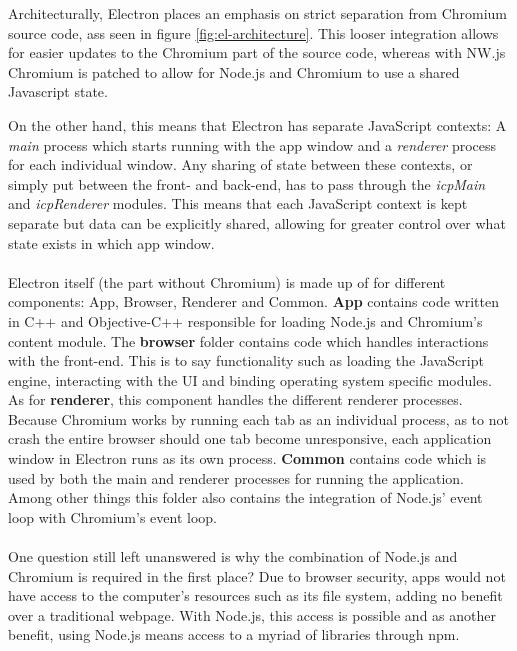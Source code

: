 Architecturally, Electron places an emphasis on strict separation from Chromium source code, ass seen in figure \ref{fig:el-architecture}.
This looser integration allows for easier updates to the Chromium part of the source code, whereas with NW.js Chromium
is patched to allow for Node.js and Chromium to use a shared Javascript state. \parencite{jensen2017}\par
On the other hand, this means that Electron has separate JavaScript contexts: A \emph{main} process which starts running
with the app window and a \emph{renderer} process for each individual window.
Any sharing of state between these contexts, or simply put between the front- and back-end, has to pass through the
\emph{icpMain} and \emph{icpRenderer} modules.
This means that each JavaScript context is kept separate but data can be explicitly shared, allowing for greater control
over what state exists in which app window. \parencite{jensen2017}\paragraph{}
Electron itself (the part without Chromium) is made up of for different components: App, Browser, Renderer and Common.
\textbf{App} contains code written in C++ and Objective-C++ responsible for loading Node.js and Chromium's content module.
The \textbf{browser} folder contains code which handles interactions with the front-end.
This is to say functionality such as loading the JavaScript engine, interacting with the UI and binding operating system
specific modules.
As for \textbf{renderer}, this component handles the different renderer processes.
Because Chromium works by running each tab as an individual process, as to not crash the entire browser should one
tab become unresponsive, each application window in Electron runs as its own process.
\textbf{Common} contains code which is used by both the main and renderer processes for running the application.
Among other things this folder also contains the integration of Node.js' event loop with Chromium's event loop. \parencite{jensen2017}\paragraph{}
One question still left unanswered is why the combination of Node.js and Chromium is required in the first place?
Due to browser security, apps would not have access to the computer's resources such as its file system, adding no
benefit over a traditional webpage.
With Node.js, this access is possible and as another benefit, using Node.js means access to a myriad of libraries
through npm.
